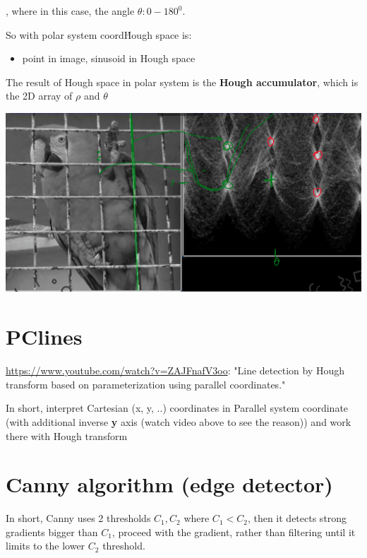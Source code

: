 \documentclass[11pt]{article}
\begin{document}
    , where in this case, the angle $\theta : 0 - 180^0$.


    So with polar system coord\. Hough space is:

    \begin{itemize}
        \item point in image, sinusoid in Hough space
    \end{itemize}

    The result of Hough space in polar system is the \textbf{Hough accumulator},
    which is the 2D array of $\rho$ and $\theta$

    \includegraphics[scale=0.2]{hough_space_lines}

    \section{PClines}

    \href{CVPR 2011}{https://www.youtube.com/watch?v=ZAJFnafV3oo}:
    "Line detection by Hough transform based on parameterization using parallel coordinates."

    In short, interpret Cartesian (x, y, ..) coordinates in Parallel system coordinate
    (with additional inverse \textbf{y} axis (watch video above to see the reason)) and work there with Hough transform

    \section{Canny algorithm (edge detector)}

    In short, Canny uses 2 thresholds $ C_1, C_2 $
    where $ C_1 < C_2 $, then
    it detects strong gradients bigger than $ C_1 $,
    proceed with the gradient, rather than filtering
    until it limits to the lower $ C_2 $ threshold.
\end{document}
